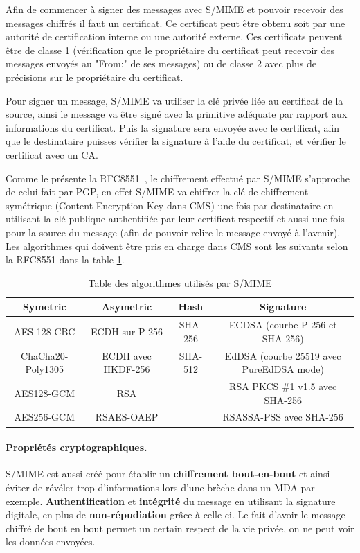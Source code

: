 Afin de commencer à signer des messages avec S/MIME et pouvoir recevoir des messages chiffrés il faut un certificat. Ce certificat peut être obtenu soit par une autorité de certification interne ou une autorité externe. Ces certificats peuvent être de classe 1 (vérification que le propriétaire du certificat peut recevoir des messages envoyés au "From:" de ses messages) ou de classe 2 avec plus de précisions sur le propriétaire du certificat.

Pour signer un message, S/MIME va utiliser la clé privée liée au certificat de la source, ainsi le message va être signé avec la primitive adéquate par rapport aux informations du certificat. Puis la signature sera envoyée avec le certificat, afin que le destinataire puisses vérifier la signature à l'aide du certificat, et vérifier le certificat avec un CA.

Comme le présente la RFC8551~\cite{RFC8551}, le chiffrement effectué par S/MIME s'approche de celui fait par PGP, en effet S/MIME va chiffrer la clé de chiffrement symétrique (Content Encryption Key dans CMS) une fois par destinataire en utilisant la clé publique authentifiée par leur certificat respectif et aussi une fois pour la source du message (afin de pouvoir relire le message envoyé à l'avenir). Les algorithmes qui doivent être pris en charge dans CMS sont les suivants selon la RFC8551 dans la table \ref{table:refSMIMEAlgos}.

\begin{table}[h!]
	\centering
	\caption{Table des algorithmes utilisés par S/MIME}
	\label{table:refSMIMEAlgos}
	\begin{adjustbox}{width=\textwidth}
		\begin{tabular}{||c c c c||}
			\hline
			Symetric & Asymetric & Hash & Signature \\ [0.5ex]
			\hline\hline
			AES-128 CBC & ECDH sur P-256 & SHA-256 & ECDSA (courbe P-256 et SHA-256) \\
			ChaCha20-Poly1305 & ECDH  avec HKDF-256 & SHA-512 & EdDSA (courbe 25519 avec PureEdDSA mode) \\
			AES128-GCM & RSA & & RSA PKCS \#1 v1.5 avec SHA-256 \\
			AES256-GCM & RSAES-OAEP & & RSASSA-PSS avec SHA-256\\
			\hline
		\end{tabular}
	\end{adjustbox}
	
\end{table}
\paragraph*{Propriétés cryptographiques.}
S/MIME est aussi créé pour établir un \textbf{chiffrement bout-en-bout} et ainsi éviter de révéler trop d'informations lors d'une brèche dans un MDA par exemple. 
\textbf{Authentification} et \textbf{intégrité} du message en utilisant la signature digitale, en plus de \textbf{non-répudiation} grâce à celle-ci. Le fait d'avoir le message chiffré de bout en bout permet un certain respect de la vie privée, on ne peut voir les données envoyées.
